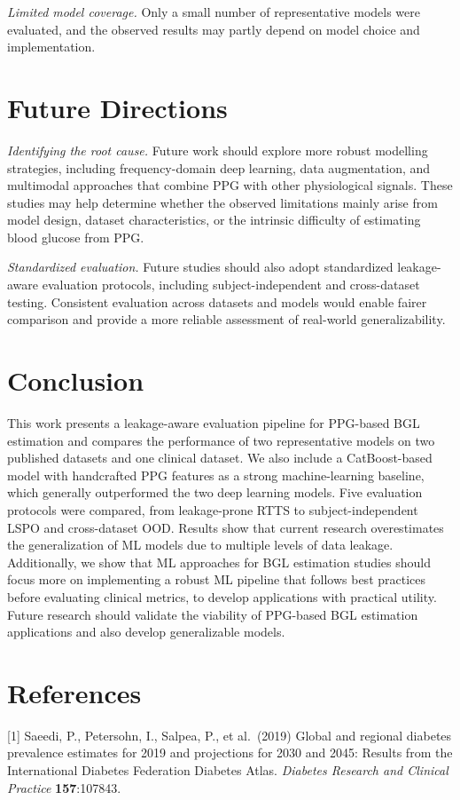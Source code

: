 \documentclass{article}
\begin{document}
\textit{Limited model coverage.}
Only a small number of representative models were evaluated, and the observed results may partly depend on model choice and implementation.





\section{Future Directions}

\textit{Identifying the root cause.}
Future work should explore more robust modelling strategies, including frequency-domain deep learning, data augmentation, and multimodal approaches that combine PPG with other physiological signals. These studies may help determine whether the observed limitations mainly arise from model design, dataset characteristics, or the intrinsic difficulty of estimating blood glucose from PPG.

\textit{Standardized evaluation.}
Future studies should also adopt standardized leakage-aware evaluation protocols, including subject-independent and cross-dataset testing. Consistent evaluation across datasets and models would enable fairer comparison and provide a more reliable assessment of real-world generalizability.


\section{Conclusion}
This work presents a leakage-aware evaluation pipeline for PPG-based BGL estimation and compares the performance of two representative models on two published datasets and one clinical dataset. We also include a CatBoost-based model with handcrafted PPG features as a strong machine-learning baseline, which generally outperformed the two deep learning models. Five evaluation protocols were compared, from leakage-prone RTTS to subject-independent LSPO and cross-dataset OOD. Results show that current research overestimates the generalization of ML models due to multiple levels of data leakage. Additionally, we show that ML approaches for BGL estimation studies should focus more on implementing a robust ML pipeline that follows best practices before evaluating clinical metrics, to develop applications with practical utility. Future research should validate the viability of PPG-based BGL estimation applications and also develop generalizable models.




\section{References}
[1] Saeedi, P., Petersohn, I., Salpea, P., et al.\ (2019)
Global and regional diabetes prevalence estimates for 2019 and projections for 2030 and 2045:
Results from the International Diabetes Federation Diabetes Atlas.
{\it Diabetes Research and Clinical Practice} {\bf 157}:107843.
\end{document}
